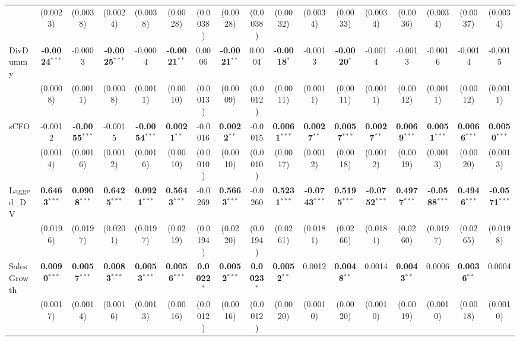 \documentclass[11pt,a4paper]{article}
\begin{document}
\begin{table}[htbp]
\begin{tabular}{lcccccccccccccccc}
 & (0.0023) & (0.0038) & (0.0024) & (0.0038) & (0.0028) & (0.0038) & (0.0028) & (0.0038) & (0.0032) & (0.0034) & (0.0033) & (0.0034) & (0.0036) & (0.0034) & (0.0037) & (0.0034) \\
DivDummy & \textbf{-0.0024}$^{***}$ & -0.0003 & \textbf{-0.0025}$^{***}$ & -0.0004 & \textbf{-0.0021}$^{**}$ & 0.0006 & \textbf{-0.0021}$^{**}$ & 0.0004 & \textbf{-0.0018}$^{*}$ & -0.0013 & \textbf{-0.0020}$^{*}$ & -0.0014 & -0.0013 & -0.0016 & -0.0014 & -0.0015 \\
 & (0.0008) & (0.0011) & (0.0008) & (0.0011) & (0.0010) & (0.0013) & (0.0009) & (0.0012) & (0.0011) & (0.0011) & (0.0011) & (0.0011) & (0.0012) & (0.0011) & (0.0012) & (0.0011) \\
sCFO & -0.0012 & \textbf{-0.0055}$^{***}$ & -0.0015 & \textbf{-0.0054}$^{***}$ & \textbf{0.0021}$^{**}$ & -0.0016 & \textbf{0.0022}$^{**}$ & -0.0015 & \textbf{0.0061}$^{***}$ & \textbf{0.0027}$^{**}$ & \textbf{0.0057}$^{***}$ & \textbf{0.0027}$^{**}$ & \textbf{0.0069}$^{***}$ & \textbf{0.0051}$^{***}$ & \textbf{0.0066}$^{***}$ & \textbf{0.0050}$^{***}$ \\
 & (0.0014) & (0.0016) & (0.0012) & (0.0016) & (0.0010) & (0.0010) & (0.0010) & (0.0010) & (0.0017) & (0.0012) & (0.0018) & (0.0012) & (0.0019) & (0.0013) & (0.0020) & (0.0013) \\
Lagged\_DV & \textbf{0.6463}$^{***}$ & \textbf{0.0908}$^{***}$ & \textbf{0.6425}$^{***}$ & \textbf{0.0921}$^{***}$ & \textbf{0.5643}$^{***}$ & -0.0269 & \textbf{0.5663}$^{***}$ & -0.0260 & \textbf{0.5231}$^{***}$ & \textbf{-0.0743}$^{***}$ & \textbf{0.5195}$^{***}$ & \textbf{-0.0752}$^{***}$ & \textbf{0.4977}$^{***}$ & \textbf{-0.0588}$^{***}$ & \textbf{0.4946}$^{***}$ & \textbf{-0.0571}$^{***}$ \\
 & (0.0196) & (0.0197) & (0.0201) & (0.0197) & (0.0219) & (0.0194) & (0.0220) & (0.0194) & (0.0261) & (0.0181) & (0.0266) & (0.0181) & (0.0260) & (0.0197) & (0.0265) & (0.0198) \\
SalesGrowth & \textbf{0.0090}$^{***}$ & \textbf{0.0057}$^{***}$ & \textbf{0.0083}$^{***}$ & \textbf{0.0053}$^{***}$ & \textbf{0.0056}$^{***}$ & \textbf{0.0022}$^{*}$ & \textbf{0.0052}$^{***}$ & \textbf{0.0023}$^{*}$ & \textbf{0.0052}$^{**}$ & 0.0012 & \textbf{0.0048}$^{**}$ & 0.0014 & \textbf{0.0043}$^{**}$ & 0.0006 & \textbf{0.0036}$^{**}$ & 0.0004 \\
 & (0.0017) & (0.0014) & (0.0016) & (0.0013) & (0.0016) & (0.0012) & (0.0016) & (0.0012) & (0.0020) & (0.0010) & (0.0020) & (0.0010) & (0.0019) & (0.0010) & (0.0018) & (0.0010) \\

\end{tabular}
\end{table}
\end{document}

